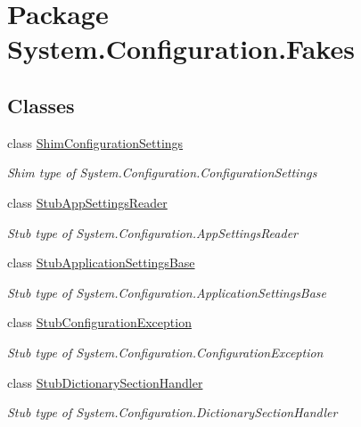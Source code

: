 \hypertarget{namespace_system_1_1_configuration_1_1_fakes}{\section{Package System.\-Configuration.\-Fakes}
\label{namespace_system_1_1_configuration_1_1_fakes}
}
\subsection*{Classes}
\begin{DoxyCompactItemize}
\item 
class \hyperlink{class_system_1_1_configuration_1_1_fakes_1_1_shim_configuration_settings}{Shim\-Configuration\-Settings}
\begin{DoxyCompactList}\small\item\em Shim type of System.\-Configuration.\-Configuration\-Settings\end{DoxyCompactList}\item 
class \hyperlink{class_system_1_1_configuration_1_1_fakes_1_1_stub_app_settings_reader}{Stub\-App\-Settings\-Reader}
\begin{DoxyCompactList}\small\item\em Stub type of System.\-Configuration.\-App\-Settings\-Reader\end{DoxyCompactList}\item 
class \hyperlink{class_system_1_1_configuration_1_1_fakes_1_1_stub_application_settings_base}{Stub\-Application\-Settings\-Base}
\begin{DoxyCompactList}\small\item\em Stub type of System.\-Configuration.\-Application\-Settings\-Base\end{DoxyCompactList}\item 
class \hyperlink{class_system_1_1_configuration_1_1_fakes_1_1_stub_configuration_exception}{Stub\-Configuration\-Exception}
\begin{DoxyCompactList}\small\item\em Stub type of System.\-Configuration.\-Configuration\-Exception\end{DoxyCompactList}\item 
class \hyperlink{class_system_1_1_configuration_1_1_fakes_1_1_stub_dictionary_section_handler}{Stub\-Dictionary\-Section\-Handler}
\begin{DoxyCompactList}\small\item\em Stub type of System.\-Configuration.\-Dictionary\-Section\-Handler\end{DoxyCompactList}\item 

\end{DoxyCompactItemize}
